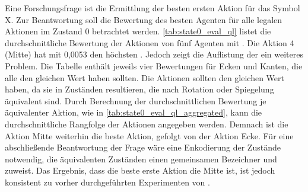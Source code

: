 Eine Forschungsfrage ist die Ermittlung der besten ersten Aktion für das Symbol X. 
Zur Beantwortung soll die Bewertung des besten \qlearning Agenten für alle legalen Aktionen im Zustand $0$ betrachtet werden. 
\cref{tab:state0_eval_ql} listet die durchschnittliche Bewertung der Aktionen von fünf \qlearning Agenten mit \wtable. 
Die Aktion 4 (Mitte) hat mit 0,0053 den höchsten \qValue. 
Jedoch zeigt die Auflistung der \qValues ein weiteres Problem.  
Die Tabelle enthält jeweils vier Bewertungen für Ecken und Kanten, die alle den gleichen Wert haben sollten. 
Die Aktionen sollten den gleichen Wert haben, da sie in Zuständen resultieren, die nach Rotation oder Spiegelung äquivalent sind. 
Durch Berechnung der durchschnittlichen Bewertung je äquivalenter Aktion, wie in \cref{tab:state0_eval_ql_aggregated}, kann die durchschnittliche Rangfolge der Aktionen angegeben werden. 
Demnach ist die Aktion Mitte weiterhin die beste Aktion, gefolgt von der Aktion Ecke. 
Für eine abschließende Beantwortung der Frage wäre eine Enkodierung der Zustände notwendig, die äquivalenten Zuständen einen gemeinsamen Bezeichner und \qValue zuweist. 
Das Ergebnis, dass die beste erste Aktion die Mitte ist, ist jedoch konsistent zu vorher durchgeführten Experimenten von \cite{kutscheraa.BestOpeningMove2018}.

